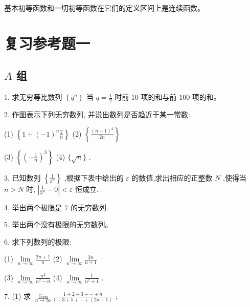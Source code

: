 \documentclass[lang=cn,newtx,10pt,scheme=chinese]{elegantbook}
\begin{document}
基本初等函数和一切初等函数在它们的定义区间上是连续函数。

\chapter*{复习参考题一}
\section*{\(A\) 组}

1. 求无穷等比数列 \(\left\{ {q}^{n}\right\}\) 当 \(q = \frac{1}{2}\) 时前 10 项的和与前 100 项的和。

2. 作图表示下列无穷数列, 并说出数列是否趋近于某一常数:

(1) \(\left\{ {1 + {\left( -1\right) }^{n}\frac{2}{n}}\right\}\) (2) \(\left\{ \frac{{\left( n - 1\right) }^{2}}{2n}\right\}\)

(3) \(\left\{ {\left( -\frac{1}{n}\right) }^{3}\right\}\) (4) \(\{ \sqrt{n}\}\) .

3. 已知数列 \(\left\{ \frac{1}{{3}^{n}}\right\}\) ,根据下表中给出的 \(\varepsilon\) 的数值,求出相应的正整数 \(N\) ,使得当 \(n > N\) 时, \(\left| {\frac{1}{{3}^{n}} - 0}\right| < \varepsilon\) 恒成立.

\begin{center}
\end{center}

4. 举出两个极限是 7 的无穷数列.

5. 举出两个没有极限的无穷数列。

6. 求下列数列的极限:

(1) \(\mathop{\lim }\limits_{{n \rightarrow \infty }}\frac{{2n} + 1}{n}\) (2) \(\mathop{\lim }\limits_{{n \rightarrow \infty }}\frac{3n}{n + 1}\)

(3) \(\mathop{\lim }\limits_{{n \rightarrow \infty }}\frac{{n}^{2}}{{n}^{2} - n}\) (4) \(\mathop{\lim }\limits_{{n \rightarrow \infty }}\frac{1}{{n}^{2} + 1}\) .

7. (1) 求 \(\mathop{\lim }\limits_{{n \rightarrow \infty }}\frac{1 + 2 + 3 + \cdots + n}{1 + 3 + 5 + \cdots + \left( {{2n} - 1}\right) }\) ;
\end{document}
